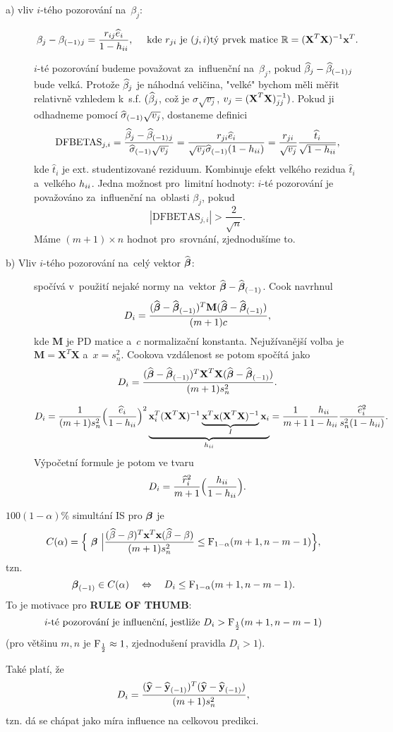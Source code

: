 \begin{description}
	\item[a) vliv $i$-tého pozorování na~$\beta_j$:]
	$$\beta_j-{\beta_{(-1)}}{}_j=\frac{r_{ij}\widehat{e}_i}{1-h_{ii}},\quad\text{ kde }r_{ji}\text{ je }(j,i)\text{tý prvek matice }\mathbb{R}=(\textbf{X}^T\textbf{X})^{-1}\textbf{x}^T.$$
	
	$i$-té pozorování budeme považovat za~influenční na~$\beta_j$, pokud $\widehat{\beta}_j-{\widehat{\beta}_{(-1)}}{}_j$ bude velká. Protože $\widehat{\beta} _j$ je náhodná veličina, "velké" bychom měli měřit relativně vzhledem k~s.f. $(\widehat{\beta} _j$, což je $\sigma\sqrt{v_j}$, $v_j=(\textbf{X}^T\textbf{X})^{-1} _{jj})$. Pokud ji odhadneme pomocí ${\widehat{{\sigma}}_{(-1)}}\sqrt{v_j}$, dostaneme definici
	$$ \mathrm{DFBETAS}_{j,i}=\frac{\widehat{\beta}_j-{\widehat{\beta}_{(-1)}}{}_j}{{\widehat{{\sigma}}_{(-1)}}\sqrt{v_j}}=\frac{r_{ji}\widehat{e}_i}{\sqrt{v_j}{\widehat{{\sigma}}_{(-1)}}(1-h_{ii})}=\frac{r_{ji}}{\sqrt{v_j}}\frac{\widehat{t}_i}{\sqrt{1-h_{ii}}},$$
	kde $\widehat{t}_i$ je ext. studentizované reziduum. Kombinuje efekt velkého rezidua $\widehat{t}_i$ a~velkého $h_{ii}$. Jedna možnost pro~limitní hodnoty: $i$-té pozorování je považováno za~influenční na~oblasti $\beta_j$, pokud 
	$$ |\mathrm{DFBETAS}_{j,i}|>\frac{2}{\sqrt{n}}.$$ Máme $(m+1)\times n$ hodnot pro~srovnání, zjednodušíme to.
	\item[b) Vliv $i$-tého pozorování na~celý vektor $\widehat{\boldsymbol{\beta}}$:] 
	spočívá v~použití nejaké normy na~vektor $\widehat{\boldsymbol{\beta}}-{\widehat{\boldsymbol{\beta}}_{(-1)}}$. Cook navrhnul
	$$ D_i=\frac{(\widehat{\boldsymbol{\beta}}-{\widehat{\boldsymbol{\beta}}_{(-1)}})^T\textbf{M}(\widehat{\boldsymbol{\beta}}-{\widehat{\boldsymbol{\beta}}_{(-1)}})}{(m+1)c},$$
	kde $\textbf{M}$ je PD matice a~$c$ normalizační konstanta. Nejužívanější volba je $\textbf{M}=\textbf{X}^T\textbf{X}$ a~$x=s_n^2$. Cookova vzdálenost se potom spočítá jako 
	$$ D_i=\frac{(\widehat{\boldsymbol{\beta}}-{\widehat{\boldsymbol{\beta}}_{(-1)}})^T\textbf{X}^T\textbf{X}(\widehat{\boldsymbol{\beta}}-{\widehat{\boldsymbol{\beta}}_{(-1)}})}{(m+1)s_n^2}.$$
	
	$$ D_i=\frac{1}{(m+1)s_n^2}\Big(\frac{\widehat{e}_i}{1-h_{ii}}\Big)^2 \underbrace{\textbf{x}_i^T(\textbf{X}^T\textbf{X})^{-1} \underbrace{\textbf{x}^T\textbf{x}(\textbf{X}^T\textbf{X})^{-1}}_{I}\textbf{x}_i}_{h_{ii}}=\frac{1}{m+1}\frac{h_{ii}}{1-h_{ii}}\frac{\widehat{e}_i^2}{s_n^2(1-h_{ii})}.$$
	Výpočetní formule je potom ve tvaru
	$$ D_i=\frac{\widehat{r}_i^2}{m+1}\Big(\frac{h_{ii}}{1-h_{ii}}\Big).$$
\end{description}
\begin{remark}
	$100(1-\alpha)\%$ simultání IS pro $\boldsymbol{\beta}$ je $$ C(\alpha)=\Big\{ ~\boldsymbol{\beta}~\Big|\frac{(\widehat{\beta}-\beta)^T\textbf{x}^T\textbf{x}(\widehat{\beta}-\beta)}{(m+1)s_n^2}\leq \mathrm{F}_{1-\alpha}(m+1,n-m-1) \Big\},$$
	tzn. $${\boldsymbol{\beta}_{(-1)}}\in C(\alpha)\quad \Leftrightarrow\quad D_i\leq \mathrm{F}_{1-\alpha}(m+1,n-m-1).$$
	To je motivace pro \textbf{RULE OF THUMB}: $$\text{$i$-té pozorování je influenční, jestliže $D_i>\mathrm{F}_{\frac{1}{2}}(m+1,n-m-1)$}$$ (pro většinu $m,n$ je $\mathrm{F}_{\frac{1}{2}}\approx1$, zjednodušení pravidla $D_i>1$).
\end{remark}
\begin{remark}
	Také platí, že 
	$$ D_i=\frac{(\widehat{\textbf{y}}-{\widehat{\textbf{y}}_{(-1)}})^T(\widehat{\textbf{y}}-{\widehat{\textbf{y}}_{(-1)}})}{(m+1)s_n^2},$$
	tzn. dá se chápat jako míra influence na celkovou predikci.
\end{remark}
